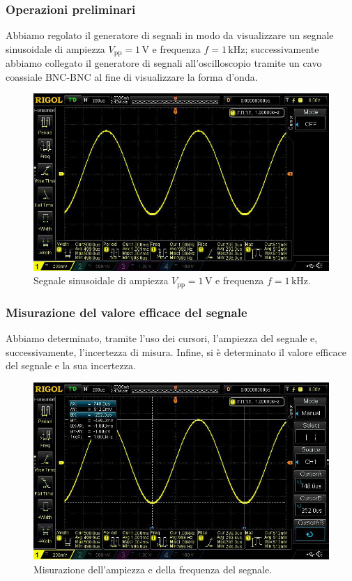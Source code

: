 \documentclass[a4paper]{article}
\begin{document}
			\subsubsection{Operazioni preliminari}
				Abbiamo regolato il generatore di segnali in modo da visualizzare un segnale sinusoidale di ampiezza $ V_{\mathrm{pp}} = 1 \, \mathrm{V} $ e frequenza $ f = 1 \, \mathrm{kHz} $; successivamente abbiamo collegato il generatore di segnali all'oscilloscopio tramite un cavo coassiale BNC-BNC al fine di visualizzare la forma d'onda.
				\begin{figure}[h!]
					\centering
					\includegraphics[scale=0.3]{segnalePuro}
					\caption{Segnale sinusoidale di ampiezza $ V_{\mathrm{pp}} = 1 \, \mathrm{V} $ e frequenza $ f = 1 \, \mathrm{kHz} $.}
					\label{fig:segnalePuro}
				\end{figure}
			\subsubsection{Misurazione del valore efficace del segnale}
				Abbiamo determinato, tramite l'uso dei cursori, l'ampiezza del segnale e, successivamente, l'incertezza di misura. Infine, si è determinato il valore efficace del segnale e la sua incertezza.
				\begin{figure}[h!]
					\centering
					\includegraphics[scale=0.3]{segnaleMisure}
					\caption{Misurazione dell'ampiezza e della frequenza del segnale.}
					\label{fig:segnaleMisure}
				\end{figure}
\end{document}
